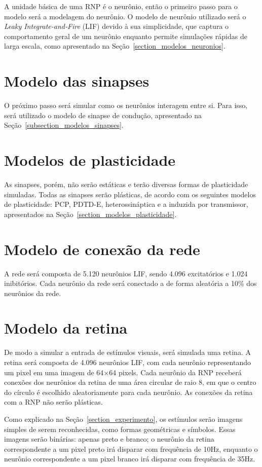 A unidade básica de uma RNP é o neurônio, então o primeiro passo para o modelo será a modelagem do neurônio. O modelo de neurônio
utilizado será o \textit{Leaky Integrate-and-Fire} (LIF) devido à sua simplicidade, que captura o comportamento geral de um
neurônio enquanto permite simulações rápidas de larga escala, como apresentado na Seção~\ref{section_modelos_neuronios}.

\section{Modelo das sinapses}

O próximo passo será simular como os neurônios interagem entre si. Para isso, será utilizado o modelo de sinapse de condução,
apresentado na Seção~\ref{subsection_modelos_sinapses}.

\section{Modelos de plasticidade}

As sinapses, porém, não serão estáticas e terão diversas formas de plasticidade simuladas. Todas as sinapses serão plásticas, de
acordo com os seguintes modelos de plasticidade: PCP, PDTD-E, heterossináptica e a induzida por transmissor, apresentados na
Seção~\ref{section_modelos_plasticidade}.

\section{Modelo de conexão da rede}

A rede será composta de 5.120 neurônios LIF, sendo 4.096 excitatórios e 1.024 inibitórios. Cada neurônio da rede será conectado a
de forma aleatória a 10\% dos neurônios da rede.

\section{Modelo da retina}

De modo a simular a entrada de estímulos visuais, será simulada uma retina. A retina será composta de 4.096 neurônios LIF, com
cada neurônio representando um pixel em uma imagem de 64$\times$64 pixels. Cada neurônio da RNP receberá conexões dos neurônios da
retina de uma área circular de raio 8, em que o centro do círculo é escolhido aleatoriamente para cada neurônio. As conexões da
retina com a RNP não serão plásticas.

Como explicado na Seção~\ref{section_experimento}, os estímulos serão imagens simples de serem reconhecidas, como formas
geométricas e símbolos. Essas imagens serão binárias: apenas preto e branco; o neurônio da retina correspondente a um pixel preto
irá disparar com frequência de 10Hz, enquanto o neurônio correspondente a um pixel branco irá disparar com frequência de 35Hz.

